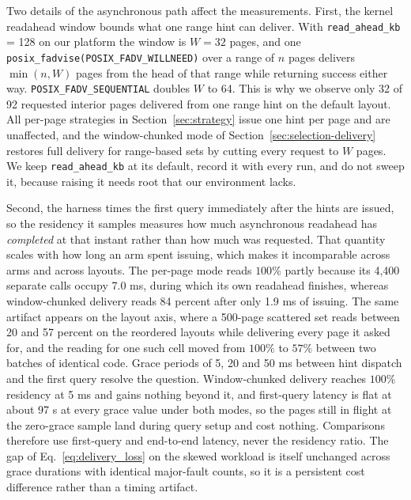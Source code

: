 \documentclass[sigconf, nonacm]{acmart}
\begin{document}
Two details of the asynchronous path affect the measurements. First, the kernel readahead
window bounds what one range hint can deliver. With \texttt{read\_ahead\_kb} = 128 on our
platform the window is $W = 32$ pages, and one
\texttt{posix\_fadvise(POSIX\_FADV\_WILLNEED)} over a range of $n$ pages delivers
$\min(n, W)$ pages from the head of that range while returning success either way.
\texttt{POSIX\_FADV\_SEQUENTIAL} doubles $W$ to 64. This is why we observe only 32 of 92
requested interior pages delivered from one range hint on the default layout. All per-page
strategies in Section~\ref{sec:strategy} issue one hint per page and are unaffected, and the
window-chunked mode of Section~\ref{sec:selection-delivery} restores full delivery for
range-based sets by cutting every request to $W$ pages. We keep \texttt{read\_ahead\_kb} at
its default, record it with every run, and do not sweep it, because raising it needs root
that our environment lacks.

Second, the harness times the first query immediately after the hints are issued, so the
residency it samples measures how much asynchronous readahead has \textit{completed} at that
instant rather than how much was requested. That quantity scales with how long an arm spent
issuing, which makes it incomparable across arms and across layouts. The per-page mode reads
$100\%$ partly because its 4,400 separate calls occupy 7.0 ms, during which its own readahead
finishes, whereas window-chunked delivery reads 84 percent after only 1.9 ms of issuing. The
same artifact appears on the layout axis, where a 500-page scattered set reads between 20 and
57 percent on the reordered layouts while delivering every page it asked for, and the reading
for one such cell moved from $100\%$ to $57\%$ between two batches of identical code. Grace
periods of 5, 20 and 50 ms between hint dispatch and the first query resolve the question.
Window-chunked delivery reaches $100\%$ residency at 5 ms and gains nothing beyond it, and
first-query latency is flat at about 97 \textmu s at every grace value under both modes, so
the pages still in flight at the zero-grace sample land during query setup and cost nothing.
Comparisons therefore use first-query and end-to-end latency, never the residency ratio. The
gap of Eq.~\ref{eq:delivery_loss} on the skewed workload is itself unchanged across grace
durations with identical major-fault counts, so it is a persistent cost difference rather
than a timing artifact.
\end{document}
